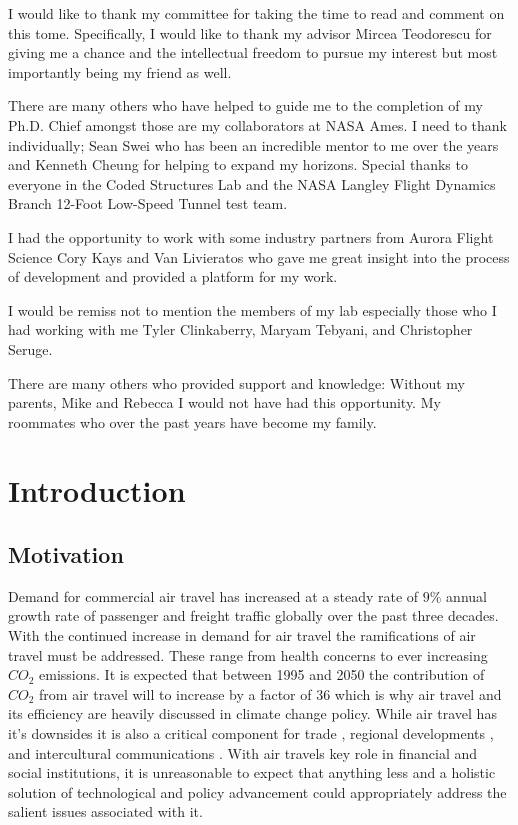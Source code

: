 \documentclass[11pt]{ucthesis}
\begin{document}
\begin{frontmatter}
\begin{acknowledgements}
I would like to thank my committee for taking the time to read and comment on this tome. Specifically, I would like to thank my advisor Mircea Teodorescu for giving me a chance and the intellectual freedom to pursue my interest but most importantly being my friend as well. 

There are many others who have helped to guide me to the completion of my Ph.D. Chief amongst those are my collaborators at NASA Ames. I need to thank individually; Sean Swei who has been an incredible mentor to me over the years and Kenneth Cheung for helping to expand my horizons. Special thanks to everyone in the Coded Structures Lab and the NASA Langley Flight Dynamics Branch 12-Foot Low-Speed Tunnel test team.

I had the opportunity to work with some industry partners from Aurora Flight Science Cory Kays and Van Livieratos who gave me great insight into the process of development and provided a platform for my work.

I would be remiss not to mention the members of my lab especially those who I had working with me Tyler Clinkaberry, Maryam Tebyani, and Christopher Seruge.

There are many others who provided support and knowledge: Without my parents, Mike and Rebecca I would not have had this opportunity. My roommates who over the past years have become my family.
\end{acknowledgements}

\end{frontmatter}

\chapter{Introduction}

\section{Motivation}
Demand for commercial air travel has increased at a steady rate of $9\%$ annual growth rate of passenger and freight traffic globally over the past three decades. \cite{upham2003environmental} With the continued increase in demand for air travel the ramifications of air travel must be addressed. These range from health concerns to ever increasing $CO_2$ emissions. It is expected that between 1995 and 2050 the contribution of $CO_2$ from air travel will to increase by a factor of 36 which is why air travel and its efficiency are heavily discussed in climate change policy. \cite{olsthoorn2001carbon} While air travel has it's downsides it is also a critical component for trade \cite{smith2001world}, regional developments \cite{marazzo2010air}, and intercultural communications \cite{adey2007flying}. With air travels key role in financial and social institutions, it is unreasonable to expect that anything less and a holistic solution of technological and policy advancement could appropriately address the salient issues associated with it.
\end{document}
